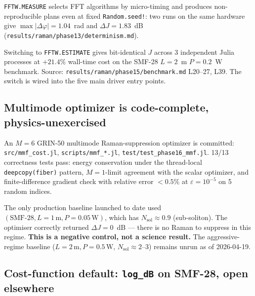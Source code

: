 \documentclass[12pt,a4paper]{article}
\theoremstyle{definition}
\begin{document}
\texttt{FFTW.MEASURE} selects FFT algorithms by micro-timing and
produces non-reproducible plans even at fixed \texttt{Random.seed!}:
two runs on the same hardware give $\max|\Delta\varphi| = 1.04$~rad
and $\Delta J = 1.83$~dB (\texttt{results/raman/phase13/determinism.md}).

Switching to \texttt{FFTW.ESTIMATE} gives bit-identical $J$ across
3 independent Julia processes at $+21.4\%$ wall-time cost on the
SMF-28 $L{=}2$~m $P{=}0.2$~W benchmark. Source:
\texttt{results/raman/phase15/benchmark.md} L20--27, L39. The switch is
wired into the five main driver entry points.

\subsection{Multimode optimizer is code-complete, physics-unexercised}
\label{sec:april-mmf}

An $M = 6$ GRIN-50 multimode Raman-suppression optimizer is committed:
\texttt{src/mmf\_cost.jl}, \texttt{scripts/mmf\_*.jl},
\texttt{test/test\_phase16\_mmf.jl}. 13/13 correctness tests pass:
energy conservation under the thread-local \texttt{deepcopy(fiber)}
pattern, $M{=}1$-limit agreement with the scalar optimizer, and
finite-difference gradient check with relative error $< 0.5\%$ at
$\varepsilon = 10^{-5}$ on 5 random indices.

\begin{flagged}
The only production baseline launched to date used $(\text{SMF-28},
L{=}1\,\mathrm{m}, P{=}0.05\,\mathrm{W})$, which has
$N_\text{sol} \approx 0.9$ (sub-soliton). The optimiser correctly
returned $\Delta J = 0$~dB --- there is no Raman to suppress in this
regime. \textbf{This is a negative control, not a science result.}
The aggressive-regime baseline
($L{=}2\,\mathrm{m}, P{=}0.5\,\mathrm{W}$, $N_\text{sol} \approx 2$--$3$)
remains unrun as of 2026-04-19.
\end{flagged}

\subsection{Cost-function default: \texttt{log\_dB} on SMF-28, open elsewhere}
\label{sec:april-cost}
\end{document}
